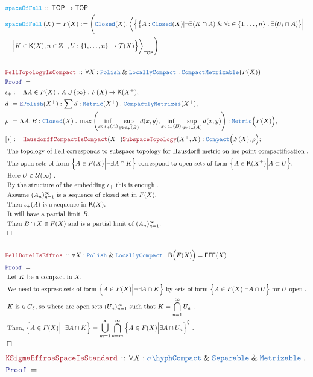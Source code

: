 \documentclass[12pt]{scrartcl}
\newcommand{\TYPE}[1]{\textcolor{NavyBlue}{\mathtt{#1}}}
\newcommand{\FUNC}[1]{\textcolor{Cerulean}{\mathtt{#1}}}
\newcommand{\LOGIC}[1]{\textcolor{Blue}{\mathtt{#1}}}
\newcommand{\THM}[1]{\textcolor{Maroon}{\mathtt{#1}}}
\renewcommand{\.}{\; . \;}
\newcommand{\de}{: \kern 0.1pc =}
\newcommand{\Act}[1]{\left( #1 \right)}
\newcommand{\Theorem}[2]{& \THM{#1} \, :: \, #2 \\ & \Proof = \\ }
\newcommand{\DeclareFunc}[2]{& \FUNC{#1} \, :: \, #2 \\}
\newcommand{\DefineNamedFunc}[4]{&  \FUNC{#1}\Act{#2} = #3 \de #4 \\}
\newcommand{\NewLine}{\\ & \kern 1pc}
\newcommand{\Page}[1]{ \begin{align*} #1 \end{align*}   }
\renewcommand{\And}{\; \& \;}
\newcommand{\Elim}{\LOGIC{E}}
\newcommand{\Int}{\mathbb{Z} }
\renewcommand{\c}{\complement}
\newcommand{\Say}[3]{& #1 \de #2 : #3, \\}
\newcommand{\Conclude}[3]{& #1 \de #2 : #3; \\}
\newcommand{\QED}{\; \square}
\newcommand{\EndProof}{& \QED \\}
\newcommand{\Proof}{\LOGIC{Proof} \; }
\newcommand{\Explain}[1]{& \text{#1.} \\}
\newcommand{\LC}{\TYPE{LocallyCompact}}
\newcommand{\Compact}{\TYPE{Compact}}
\newcommand{\Closed}{\TYPE{Closed}}
\newcommand{\Separable}{\TYPE{Separable}}
\newcommand{\TOP}{\mathsf{TOP}}
\newcommand{\T}{\mathcal{T}}
\newcommand{\U}{\mathcal{U}}
\newcommand{\Metrizable}{\TYPE{Metrizable}}
\newcommand{\Polish}{\TYPE{Polish}}
\newcommand{\bor}{\mathsf{B}}
\newcommand{\Effros}{\mathsf{EFF}}
\newcommand{\K}{\mathsf{K}}
\begin{document}
\Page{
	\DeclareFunc{spaceOfFell}
	{
		\TOP
		\to
		\TOP
	}
	\DefineNamedFunc{spaceOfFell}{X}{F(X)}
	{
		\Bigg( \Closed(X), 
		\bigg\langle
			\Big\{ 
			\big\{ A : \Closed(X) | \neg\exists(K  \cap A) \And 
			 	\forall i \in \{1,\ldots,n\} \. \exists(U_i \cap A) \big\} 
			\Big| \NewLine \Big|
			K \in \K(X), n \in \Int_+, U: \{1,\ldots,n\} \to \T(X) 
		\Big\}
		\bigg\rangle_\TOP
		\Bigg)
	}
	\\
	\Theorem{FellTopologyIsCompact}
	{
		\forall X :  \Polish \And \LC \.
		\TYPE{CompactMetrizable}\big(F(X)\big)
	}
	\Say{\iota_+}{
		\Lambda  A  \in F(X) \.
		A \cup \{\infty\}
	}
	{
		F(X) \to \K(X^+)
	}
	\Say{d}{\Elim \Polish(X^+)}
	{
		\sum d : \TYPE{Metric}(X^+) \.
		\TYPE{CompactlyMetrizes}(X^+)	
	}
	\Say{\rho}
	{
		\Lambda A,B : \Closed(X)	\.	
		\max\left(
		\inf_{x \in \iota_+(A)} \sup_{y \in \iota_+(B)} d(x,y),
		\inf_{x \in \iota_+(B)} \sup_{y \in \iota_+(A)} d(x,y)
		\right)
	}
	{
		\TYPE{Metric}\Big( F(X) \Big)
	}
	\Conclude{[*]}{\THM{HausdorffCompactIsCompact}(X^+)\THM{SubspaceTopology}(X^+,X)}
	{
		\Compact\Big( F(X), \rho \Big)
	}
	\Explain{
		The topology of Fell 
		corresponds 
		to subspace topology 
		for Hausdorff metric on ine point compactification
	}
	\Explain{
		The open sets of form
		$\Big\{ A \in F(X)  \Big| \neg \exists A \cap K  \Big\}$
		correspond to open sets of form
		$\Big\{ A \in \K(X^+)  \Big|  A \subset U  \Big\}$}
	\Explain{		
		Here $U \in \U(\infty)$  
	}
	\Explain{
		By the structure of the embedding  $\iota_+$ this is enough 
	}	
	\Explain{ Assume $(A_n)^\infty_{n=1}$ is a sequence of closed set in $F(X)$}
	\Explain{ Then $\iota_+(A)$ is a sequence in $\K(X)$}
	\Explain{ It will have a partial limit $B$}
	\Explain{ Then $B\cap X \in F(X) $ and is a partial limit of $(A_n)^\infty_{n=1}$}
	\EndProof
	\\
	\Theorem{FellBorelIsEffros}
	{
		\forall X : \Polish \And \LC \.
		\bor \Big( F(X)\Big) = \Effros(X)
	}
	\Explain{ Let $K$ be a compact in $X$}
	\Explain{ 
		We need to express sets of form 
		$\Big\{ A \in F(X)  \Big| \neg \exists A \cap K  \Big\}$
		by sets of form
		$\Big\{ A \in F(X) \Big| \exists A \cap U \Big\} $ for $U$ open 
	}
	\Explain{
		$K$ is a $G_\delta$, so where are open sets $(U_n)^\infty_{n=1}$ 
		such that $K = \bigcap^\infty_{n=1} U_n$
	}
	\Explain{
		Then,
		$
			\Big\{ A \in F(X)  \Big| \neg \exists A \cap K  \Big\} =
			\bigcup^\infty_{m=1}
			\bigcap^\infty_{n=m} 
			\Big\{
				A  \in F(X) \Big| \exists A \cap U_n
			\Big\}^\c
		$
	}
	\EndProof
}\Page{
	\Theorem{KSigmaEffrosSpaceIsStandard}
	{
		\forall  X : \TYPE{\sigma\hyph Compact} \And \Separable \And \Metrizable \.
}}
\end{document}

